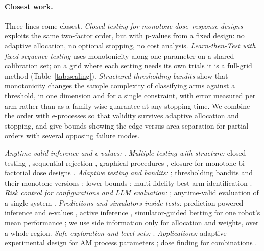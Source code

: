 \documentclass{article}
\begin{document}
\paragraph{Closest work.} Three lines come closest. \emph{Closed testing
for monotone dose--response designs} \citep{hellmich2005closure} exploits
the same two-factor order, but with p-values from a fixed design: no
adaptive allocation, no optional stopping, no cost analysis.
\emph{Learn-then-Test with fixed-sequence testing}
\citep{angelopoulos2025ltt} uses monotonicity along one parameter on a
shared calibration set; on a grid where each setting needs its own trials
it is a full-grid method (Table~\ref{tab:scaling}). \emph{Structured
thresholding bandits} \citep{garivier2017dose, cheshire2020shape,
cheshire2021problem} show that monotonicity changes the sample complexity
of classifying arms against a threshold, in one dimension and for a single
constraint, with error measured per arm rather than as a family-wise
guarantee at any stopping time. We combine the order with e-processes so
that validity survives adaptive allocation and stopping, and give bounds
showing the edge-versus-area separation for partial orders with several
opposing failure modes.


\emph{Anytime-valid inference and e-values:} \citet{ville1939,
shafer2021, ramdas2023savi, vovk2021evalues, wang2022ebh,
waudbysmith2024betting}. \emph{Multiple testing with structure:} closed
testing \citep{marcus1976closed}, sequential rejection
\citep{goeman2010sequential}, graphical procedures
\citep{bretz2009graphical}, closure for monotone bi-factorial dose designs
\citep{hellmich2005closure}. \emph{Adaptive testing and bandits:}
\citet{jamieson2018bandit, xu2021unified}; thresholding bandits
\citep{locatelli2016tbp} and their monotone versions
\citep{garivier2017dose, cheshire2020shape, cheshire2021problem}; lower
bounds \citep{garivier2016optimal, kaufmann2016complexity,
garivier2019explore}; multi-fidelity best-arm identification
\citep{poiani2022multifidelity, poiani2024optimal}. \emph{Risk control for
configurations and LLM evaluation:} \citet{angelopoulos2025ltt,
laufer2023pareto, quach2024conformal, joshi2025multirisk}; anytime-valid
evaluation of a single system \citep{zhou2026celeus, zhou2026auditing}.
\emph{Predictions and simulators inside tests:} prediction-powered
inference and e-values \citep{angelopoulos2023ppi, csillag2025ppe}, active
inference \citep{zrnic2024active}, simulator-guided betting for one robot's
mean performance \citep{chen2026simtoreal, chen2026certificates}; we use
side information only for allocation and weights, over a whole region.
\emph{Safe exploration and level sets:} \citet{sui2015safeopt,
losalka2023monotone, losalka2024noregret, gotovos2013lse, mason2022lse}.
\emph{Applications:} adaptive experimental design for AM process
parameters \citep{beam2026}; dose finding for combinations
\citep{wages2011pocrm}.
\end{document}
